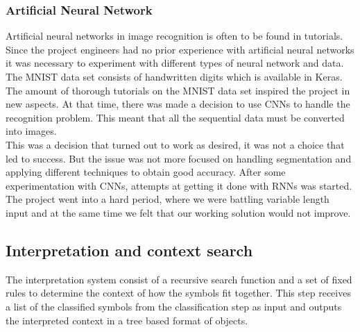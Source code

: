 \subsubsection{Artificial Neural Network}
Artificial neural networks in image recognition is often to be found in tutorials. Since the project engineers had no prior experience with artificial neural networks it was necessary to experiment with different types of neural network and data. The MNIST data set consists of handwritten digits which is available in Keras. The amount of thorough tutorials on the MNIST data set inspired the project in new aspects. At that time, there was made a decision to use CNNs to handle the recognition problem. This meant that all the sequential data must be converted into images. \\ This was a decision that turned out to work as desired, it was not a choice that led to success. But the issue was not more focused on handling segmentation and applying different techniques to obtain good accuracy. After some experimentation with CNNs, attempts at getting it done with RNNs was started. The project went into a hard period, where we were battling variable length input and at the same time we felt that our working solution would not improve. %

\subsection{Interpretation and context search}

The interpretation system consist of a recursive search function and a set of fixed rules to determine the context of how the symbols fit together. This step receives a list of the classified symbols from the classification step as input and outputs the interpreted context in a tree based format of objects.

